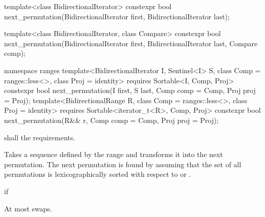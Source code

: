%
\begin{itemdecl}
template<class BidirectionalIterator>
  constexpr bool next_permutation(BidirectionalIterator first,
                                  BidirectionalIterator last);

template<class BidirectionalIterator, class Compare>
  constexpr bool next_permutation(BidirectionalIterator first,
                                  BidirectionalIterator last, Compare comp);
\end{itemdecl}
\begin{addedblock}
\begin{itemdecl}
namespace ranges {
  template<BidirectionalIterator I, Sentinel<I> S, class Comp = ranges::less<>,
      class Proj = identity>
    requires Sortable<I, Comp, Proj>
    constexpr bool
      next_permutation(I first, S last, Comp comp = Comp{}, Proj proj = Proj{});
  template<BidirectionalRange R, class Comp = ranges::less<>,
      class Proj = identity>
    requires Sortable<iterator_t<R>, Comp, Proj>
    constexpr bool
      next_permutation(R&& r, Comp comp = Comp{}, Proj proj = Proj{});
}
\end{itemdecl}
\end{addedblock}

\begin{itemdescr}
\pnum
\requires
{}
 shall  the
 requirements.

\pnum
\effects
Takes a sequence defined by the range
and transforms it into the next permutation.
The next permutation is found by assuming that the set of all permutations is
lexicographically sorted with respect to
or .

\pnum
\returns
{}
if 

\pnum
\complexity
At most
swaps.
\end{itemdescr}


